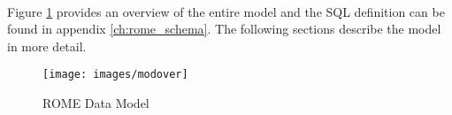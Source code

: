 
\paragraph{}
Figure \ref{fig:modover} provides an overview of the entire model and the SQL definition can be found in appendix \ref{ch:rome_schema}. The following sections describe the model in more detail.


\begin{figure}
\centering
\caption{ROME Data Model}\label{fig:modover}
\texttt{[image: images/modover]}
\end{figure}

\clearpage
